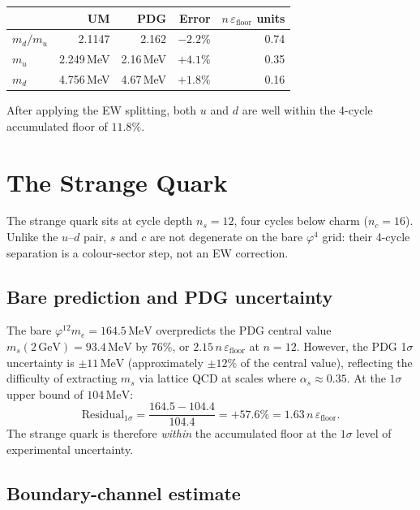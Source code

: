 \documentclass[12pt]{article}
\begin{document}
\begin{center}
\begin{tabular}{lrrrr}
\toprule
 & UM & PDG & Error & $n\,\varepsilon_\text{floor}$ units \\
\midrule
$m_d/m_u$  & 2.1147  & 2.162  & $-2.2\%$  & 0.74 \\
$m_u$      & 2.249\,MeV & 2.16\,MeV & $+4.1\%$ & 0.35 \\
$m_d$      & 4.756\,MeV & 4.67\,MeV & $+1.8\%$ & 0.16 \\
\bottomrule
\end{tabular}
\end{center}

After applying the EW splitting, both $u$ and $d$ are well within the
4-cycle accumulated floor of $11.8\%$.

\section{The Strange Quark}

The strange quark sits at cycle depth $n_s = 12$, four cycles below charm
($n_c = 16$). Unlike the $u$--$d$ pair, $s$ and $c$ are not
degenerate on the bare $\varphi^4$ grid: their 4-cycle separation is a
colour-sector step, not an EW correction.

\subsection{Bare prediction and PDG uncertainty}

The bare $\varphi^{12} m_e = 164.5\,\text{MeV}$ overpredicts the PDG central
value $m_s(2\,\text{GeV}) = 93.4\,\text{MeV}$ by $76\%$, or
$2.15\,n\,\varepsilon_{\text{floor}}$ at $n = 12$. However, the PDG
1$\sigma$ uncertainty is $\pm 11\,\text{MeV}$ (approximately $\pm 12\%$ of the
central value), reflecting the difficulty of extracting $m_s$ via lattice QCD
at scales where $\alpha_s \approx 0.35$. At the $1\sigma$ upper bound of
$104\,\text{MeV}$:
\[
  \text{Residual}_{1\sigma} = \frac{164.5 - 104.4}{104.4} = +57.6\%
  = 1.63\,n\,\varepsilon_{\text{floor}}.
\]
The strange quark is therefore \emph{within} the accumulated floor at the
$1\sigma$ level of experimental uncertainty.

\subsection{Boundary-channel estimate}
\end{document}
